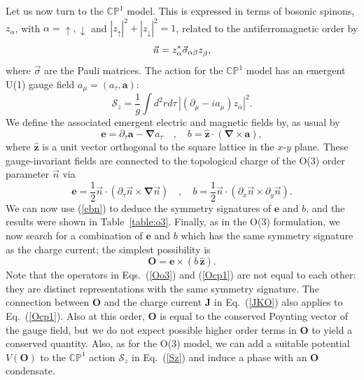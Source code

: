 \documentclass[aps,prb,preprint,onecolumn,citeautoscript,superscriptaddress,footinbib,
eqsecnum]{revtex4-1}
\newcommand{\beq}{\begin{equation}}
\newcommand{\eeq}{\end{equation}}
\begin{document}
Let us now turn to the $\mathbb{CP}^1$ model. This is expressed in terms of bosonic spinons, $z_\alpha$, with $\alpha = \uparrow, \downarrow$
and $|z_\uparrow|^2 + |z_\downarrow|^2 = 1$, related to the antiferromagnetic order by
\beq
\vec{n} = z_\alpha^\ast \vec{\sigma}_{\alpha\beta} z_\beta^{\vphantom \dagger},
\eeq
where $\vec{\sigma}$ are the Pauli matrices. The action for the $\mathbb{CP}^1$ model has an emergent U(1) gauge field $a_\mu = (a_\tau, {\bm a})$:
\beq
\mathcal{S}_z = \frac{1}{g} \int d^2 r d \tau\, |(\partial_\mu - i a_\mu) z_\alpha|^2 . \label{Sz}
\eeq
We define the associated emergent electric and magnetic fields by, as usual by
\beq
{\bm e} = \partial_\tau {\bm a} - {\bm \nabla} a_\tau \quad , \quad b =  \hat{\bm z} \cdot ( {\bm \nabla} \times {\bm a} ) ,
\eeq
where $\hat{\bm z}$ is a unit vector orthogonal to the square lattice in the $x$-$y$ plane. 
These gauge-invariant fields are connected to the topological charge of the O(3) order parameter $\vec{n}$ via
\beq
{\bm e} = \frac{1}{2} \vec{n} \cdot \left( \partial_\tau \vec{n} \times {\bm \nabla} \vec{n} \right) \quad , \quad 
b = \frac{1}{2} \vec{n} \cdot \left( \partial_x \vec{n} \times \partial_y \vec{n} \right). \label{ebn}
\eeq
We can now use (\ref{ebn}) to deduce the symmetry signatures of ${\bm e}$ and $b$, and the results were shown in Table~\ref{table:o3}.
Finally, as in the O(3) formulation, we now search for a combination of ${\bm e}$ and $b$ which has the same symmetry signature as
the charge current; the simplest possibility is
\beq
{\bm O} = {\bm e} \times (b \, \hat{\bm z}) . \label{Ocp1}
\eeq
Note that the operators in Eqs.~(\ref{Oo3})
and (\ref{Ocp1}) are not equal to each other: they are distinct representations with the same symmetry signature. The connection between ${\bm O}$
and the charge current ${\bm J}$ in Eq.~(\ref{JKO}) also applies to Eq.~(\ref{Ocp1}). Also at this order, ${\bm O}$
is equal to the conserved Poynting vector of the gauge field, but we do not expect possible higher order terms in 
${\bm O}$ to yield a conserved quantity. Also, as for the O(3) model, we can add a suitable potential $V({\bm O})$
to the $\mathbb{CP}^1$ action $\mathcal{S}_z$ in Eq.~(\ref{Sz}) and induce a phase with an ${\bm O}$ condensate.
\end{document}
